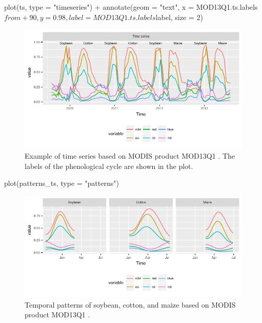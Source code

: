 \documentclass[article,shortnames]{jss}
\begin{document}
\begin{CodeChunk}
\begin{CodeInput}
plot(ts, type = "timeseries") + 
  annotate(geom = "text", x = MOD13Q1.ts.labels$from+90, y = 0.98, 
  label = MOD13Q1.ts.labels$label, size = 2)
\end{CodeInput}
\begin{figure}[!h]

{\centering \includegraphics{applying_twdtw_files/figure-latex/example-timeseries-1} 

}

\caption{Example of time series based on MODIS product MOD13Q1 \citep{Friedl:2010}. The labels of the phenological cycle are shown in the plot.}\label{fig:example-timeseries}
\end{figure}
\end{CodeChunk}\begin{CodeChunk}
\begin{CodeInput}
plot(patterns_ts, type = "patterns")
\end{CodeInput}
\begin{figure}[!h]

{\centering \includegraphics{applying_twdtw_files/figure-latex/temporal-patterns-soy-cot-mai-1} 

}

\caption{Temporal patterns of soybean, cotton, and maize based on MODIS product MOD13Q1 \citep{Friedl:2010}.}\label{fig:temporal-patterns-soy-cot-mai}
\end{figure}
\end{CodeChunk}
\end{document}
